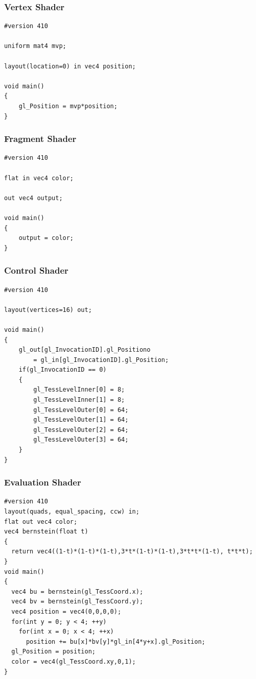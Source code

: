 \begin{frame}[fragile]
\frametitle{Vertex Shader}
	{\scriptsize
	\begin{verbatim}
#version 410

uniform mat4 mvp;

layout(location=0) in vec4 position;

void main()
{
    gl_Position = mvp*position;
}
	\end{verbatim}
	}
\end{frame}

\begin{frame}[fragile]
\frametitle{Fragment Shader}
	{\scriptsize
	\begin{verbatim}
#version 410

flat in vec4 color;

out vec4 output;

void main()
{
    output = color;
}
	\end{verbatim}
	}
\end{frame}

\begin{frame}[fragile]
\frametitle{Control Shader}
	{\scriptsize
	\begin{verbatim}
#version 410

layout(vertices=16) out;

void main()
{
    gl_out[gl_InvocationID].gl_Positiono
        = gl_in[gl_InvocationID].gl_Position;
    if(gl_InvocationID == 0)
    {
        gl_TessLevelInner[0] = 8;
        gl_TessLevelInner[1] = 8;
        gl_TessLevelOuter[0] = 64;
        gl_TessLevelOuter[1] = 64;
        gl_TessLevelOuter[2] = 64;
        gl_TessLevelOuter[3] = 64;
    }
}
	\end{verbatim}
	}
\end{frame}

\begin{frame}[fragile]
\frametitle{Evaluation Shader}
	{\scriptsize
	\begin{verbatim}
#version 410
layout(quads, equal_spacing, ccw) in;
flat out vec4 color;
vec4 bernstein(float t)
{
  return vec4((1-t)*(1-t)*(1-t),3*t*(1-t)*(1-t),3*t*t*(1-t), t*t*t);
}
void main()
{
  vec4 bu = bernstein(gl_TessCoord.x);
  vec4 bv = bernstein(gl_TessCoord.y);
  vec4 position = vec4(0,0,0,0);
  for(int y = 0; y < 4; ++y)
    for(int x = 0; x < 4; ++x)
      position += bu[x]*bv[y]*gl_in[4*y+x].gl_Position;
  gl_Position = position;
  color = vec4(gl_TessCoord.xy,0,1);
}
	\end{verbatim}
	}
\end{frame}

